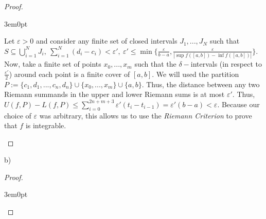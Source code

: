 \documentclass[11pt]{article}
\newenvironment{myproof}
{\begin{proof} \begin{adjustwidth}{3em}{0pt}$ $\par\nobreak\ignorespaces}
{\end{adjustwidth} \end{proof}}
\begin{document}
\begin{flushleft}
\begin{myproof}
Let $\varepsilon >0$ and consider any finite set of closed intervals $J_1,...,J_N$ such that $S \subseteq \bigcup_{i=1}^NJ_i, \ \sum_{i=1}^N(d_i - c_i)< \varepsilon', \ \varepsilon' \leq \min \{ \frac{\varepsilon}{b-a}, \frac{\varepsilon}{|\sup f([a,b]) - \inf f([a,b])|} \}$. Now, take a finite set of points $x_0,...,x_m$ such that the $\delta-$intervals (in respect to $\frac{\varepsilon'}{2}$) around each point is a finite cover of $[a,b]$. We will used the partition  $P := \{c_1,d_1,...,c_n,d_n \} \cup \{x_0,...,x_m \} \cup \{ a,b \}$. Thus, the distance between any two Riemann summands in the upper and lower Riemann sums is at most $\varepsilon'$. Thus, $U(f,P) - L(f,P) \leq \sum_{i=0}^{2n+m+3}\varepsilon' (t_i - t_{i-1})= \varepsilon' (b-a) < \varepsilon$. Because our choice of $\varepsilon$ was arbitrary, this allows us to use the \textit{Riemann Criterion} to prove that $f$ is integrable.

\end{myproof}

b)

\begin{myproof}


\end{myproof}
\end{flushleft}
\end{document}
